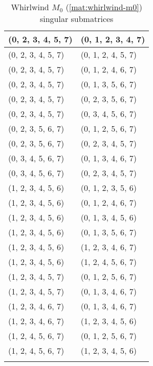 \begin{footnotesize}
\begin{longtable}[c]{|l|l|}
(0, 2, 3, 4, 5, 7)
&(0, 1, 2, 3, 4, 7)
\\ \hline
(0, 2, 3, 4, 5, 7)
&(0, 1, 2, 4, 5, 7)
\\ \hline
(0, 2, 3, 4, 5, 7)
&(0, 1, 2, 4, 6, 7)
\\ \hline
(0, 2, 3, 4, 5, 7)
&(0, 1, 3, 5, 6, 7)
\\ \hline
(0, 2, 3, 4, 5, 7)
&(0, 2, 3, 5, 6, 7)
\\ \hline
(0, 2, 3, 4, 5, 7)
&(0, 3, 4, 5, 6, 7)
\\ \hline
(0, 2, 3, 5, 6, 7)
&(0, 1, 2, 5, 6, 7)
\\ \hline
(0, 2, 3, 5, 6, 7)
&(0, 2, 3, 4, 5, 7)
\\ \hline
(0, 3, 4, 5, 6, 7)
&(0, 1, 3, 4, 6, 7)
\\ \hline
(0, 3, 4, 5, 6, 7)
&(0, 2, 3, 4, 5, 7)
\\ \hline
(1, 2, 3, 4, 5, 6)
&(0, 1, 2, 3, 5, 6)
\\ \hline
(1, 2, 3, 4, 5, 6)
&(0, 1, 2, 4, 6, 7)
\\ \hline
(1, 2, 3, 4, 5, 6)
&(0, 1, 3, 4, 5, 6)
\\ \hline
(1, 2, 3, 4, 5, 6)
&(0, 1, 3, 5, 6, 7)
\\ \hline
(1, 2, 3, 4, 5, 6)
&(1, 2, 3, 4, 6, 7)
\\ \hline
(1, 2, 3, 4, 5, 6)
&(1, 2, 4, 5, 6, 7)
\\ \hline
(1, 2, 3, 4, 5, 7)
&(0, 1, 2, 5, 6, 7)
\\ \hline
(1, 2, 3, 4, 5, 7)
&(0, 1, 3, 4, 6, 7)
\\ \hline
(1, 2, 3, 4, 6, 7)
&(0, 1, 3, 4, 6, 7)
\\ \hline
(1, 2, 3, 4, 6, 7)
&(1, 2, 3, 4, 5, 6)
\\ \hline
(1, 2, 4, 5, 6, 7)
&(0, 1, 2, 5, 6, 7)
\\ \hline
(1, 2, 4, 5, 6, 7)
&(1, 2, 3, 4, 5, 6)
\\ \hline
\caption{Whirlwind $M_0$ (\ref{mat:whirlwind-m0}) singular submatrices}\label{tbl:m0-singular}
\end{longtable}
\end{footnotesize}
